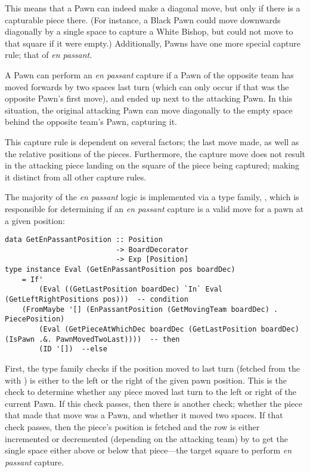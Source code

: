 
This means that a Pawn can indeed make a diagonal move, but only if there is a capturable piece there. (For instance, a Black Pawn could move downwards diagonally by a single space to capture a White Bishop, but could not move to that square if it were empty.) Additionally, Pawns have one more special capture rule; that of \emph{en passant}.

A Pawn can perform an \emph{en passant} capture if a Pawn of the opposite team has moved forwards by two spaces last turn (which can only occur if that was the opposite Pawn's first move), and ended up next to the attacking Pawn. In this situation, the original attacking Pawn can move diagonally to the empty space behind the opposite team's Pawn, capturing it.


This capture rule is dependent on several factors; the last move made, as well as the relative positions of the pieces. Furthermore, the capture move does not result in the attacking piece landing on the square of the piece being captured; making it distinct from all other capture rules.

The majority of the \emph{en passant} logic is implemented via a type family, , which is responsible for determining if an \emph{en passant} capture is a valid move for a pawn at a given position:

\begin{lstlisting}
data GetEnPassantPosition :: Position
                          -> BoardDecorator
                          -> Exp [Position]
type instance Eval (GetEnPassantPosition pos boardDec)
    = If'
        (Eval ((GetLastPosition boardDec) `In` Eval (GetLeftRightPositions pos)))  -- condition
    (FromMaybe '[] (EnPassantPosition (GetMovingTeam boardDec) . PiecePosition)
        (Eval (GetPieceAtWhichDec boardDec (GetLastPosition boardDec) (IsPawn .&. PawnMovedTwoLast))))  -- then
        (ID '[])  --else
\end{lstlisting}

First, the type family checks if the position moved to last turn (fetched from the  with ) is either to the left or the right of the given pawn position. This is the check to determine whether any piece moved last turn to the left or right of the current Pawn. If this check passes, then there is another check; whether the piece that made that move was a Pawn, and whether it moved two spaces. If that check passes, then the piece's position is fetched and the row is either incremented or decremented (depending on the attacking team) by  to get the single space either above or below that piece---the target square to perform \emph{en passant} capture.

